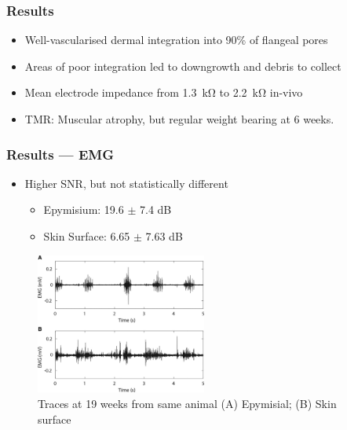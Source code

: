\begin{frame}
    \frametitle{Results}
    
    \begin{itemize}
        \item Well-vascularised dermal integration into 90\% of flangeal pores
        \item Areas of poor integration led to downgrowth and debris to collect 
        \item Mean electrode impedance from \SI{1.3}{\kilo\ohm} to \SI{2.2}{\kilo\ohm} in-vivo
        \item TMR: Muscular atrophy, but regular weight bearing at 6 weeks.
    \end{itemize}

\end{frame}

\begin{frame}
    \frametitle{Results --- EMG}

    \begin{itemize}
        \item Higher SNR, but not statistically different \begin{itemize}
            \item Epymisium: 19.6 $\pm$ 7.4 dB
            \item Skin Surface: 6.65 $\pm$  7.63 dB 
        \end{itemize}
    \end{itemize}
    \begin{figure}[h]
    \centering
        \includegraphics[width=0.5\textwidth]{figures/emg.jpeg}
    \caption{Traces at 19 weeks from same animal (A) Epymisial; (B) Skin surface}
    \label{fig:emg.jpeg}
    \end{figure}
\end{frame}